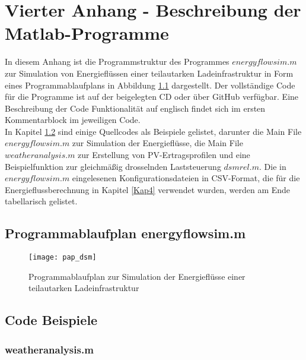 
\chapter{Vierter Anhang - Beschreibung der Matlab-Programme}
In diesem Anhang ist die Programmstruktur des Programmes $energyflowsim.m$ zur Simulation von Energieflüssen einer teilautarken Ladeinfrastruktur in Form eines Programmablaufplans in Abbildung \ref{Abb:Simulation_pap} dargestellt. Der vollständige Code für die Programme ist auf der beigelegten CD oder über GitHub verfügbar.\cite{github_energyflowsim} Eine Beschreibung der Code Funktionalität auf englisch findet sich im ersten Kommentarblock im jeweiligen Code.  \\

In Kapitel \ref{Kap:Code} sind einige Quellcodes als Beispiele gelistet, darunter die Main File $energyflowsim.m$ zur Simulation der Energieflüsse, die Main File \\$weatheranalysis.m$ zur Erstellung von PV-Ertragsprofilen und eine Beispielfunktion zur gleichmäßig drosselnden Laststeuerung $dsmrel.m$. Die in $energyflowsim.m$ eingelesenen Konfigurationsdateien in CSV-Format, die für die Energieflussberechnung in Kapitel \ref{Kap4} verwendet wurden, werden am Ende tabellarisch gelistet.

\newpage
\section{Programmablaufplan energyflowsim.m}

\begin{figure}[h] 
	\centering
	\texttt{[image: pap\_dsm]}
	\caption{Programmablaufplan zur Simulation der Energieflüsse einer teilautarken Ladeinfrastruktur}
	\label{Abb:Simulation_pap}
\end{figure} 	


\newpage
\section{Code Beispiele}
\label{Kap:Code}

  \subsection{weatheranalysis.m}
      
